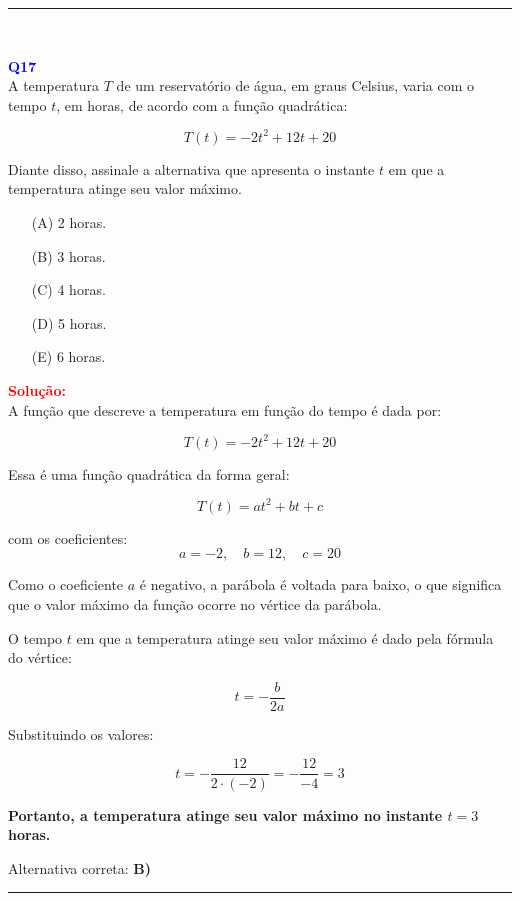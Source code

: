 \documentclass[a4paper,12pt]{article}
\begin{document}
\noindent\rule{\linewidth}{0.6pt}\\

\begin{flushleft}
\textbf{\textcolor{blue}{\Large Q17}}\\
A temperatura \( T \) de um reservatório de água, em graus Celsius, varia com o tempo \( t \), em horas, de acordo com a função quadrática:

\[
T(t) = -2t^2 + 12t + 20
\]

Diante disso, assinale a alternativa que apresenta o instante \( t \) em que a temperatura atinge seu valor máximo.
\begin{itemize}
\item[(A)] 2 horas.
\item[(B)] 3 horas.
\item[(C)] 4 horas.
\item[(D)] 5 horas.
\item[(E)] 6 horas.
\end{itemize}

\vspace{0.5cm}

\textcolor{red}{\textbf{Solução:}}\\

A função que descreve a temperatura em função do tempo é dada por:

\[
T(t) = -2t^2 + 12t + 20
\]

Essa é uma função quadrática da forma geral:

\[
T(t) = at^2 + bt + c
\]

com os coeficientes:
\[
a = -2, \quad b = 12, \quad c = 20
\]

Como o coeficiente \( a \) é negativo, a parábola é voltada para baixo, o que significa que o valor máximo da função ocorre no vértice da parábola.

O tempo \( t \) em que a temperatura atinge seu valor máximo é dado pela fórmula do vértice:

\[
t = -\frac{b}{2a}
\]

Substituindo os valores:

\[
t = -\frac{12}{2 \cdot (-2)} = -\frac{12}{-4} = 3
\]

\textbf{Portanto, a temperatura atinge seu valor máximo no instante \( t = 3 \) horas.}

Alternativa correta: \colorbox{green!50}{\textbf{B)}}

\end{flushleft}

\noindent\rule{\linewidth}{0.6pt}\\
\end{document}
